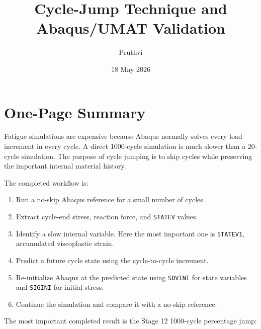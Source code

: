 \documentclass[11pt,a4paper]{article}
\title{\textbf{Cycle-Jump Technique and Abaqus/UMAT Validation}}
\author{Pruthvi}
\date{18 May 2026}
\begin{document}
\maketitle

\begin{center}
\end{center}

\tableofcontents
\newpage

\section{One-Page Summary}

Fatigue simulations are expensive because Abaqus normally solves every load increment in every cycle. A direct 1000-cycle simulation is much slower than a 20-cycle simulation. The purpose of cycle jumping is to skip cycles while preserving the important internal material history.

The completed workflow is:

\begin{enumerate}
  \item Run a no-skip Abaqus reference for a small number of cycles.
  \item Extract cycle-end stress, reaction force, and \texttt{STATEV} values.
  \item Identify a slow internal variable. Here the most important one is \texttt{STATEV1}, accumulated viscoplastic strain.
  \item Predict a future cycle state using the cycle-to-cycle increment.
  \item Re-initialize Abaqus at the predicted state using \texttt{SDVINI} for state variables and \texttt{SIGINI} for initial stress.
  \item Continue the simulation and compare it with a no-skip reference.
\end{enumerate}

The most important completed result is the Stage 12 1000-cycle percentage jump:
\end{document}
